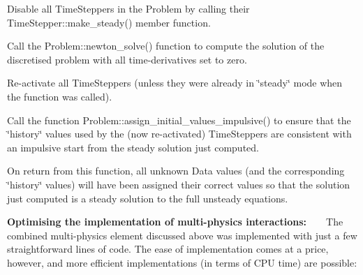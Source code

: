 \begin{DoxyItemize}
\begin{DoxyEnumerate}
\item Disable all {\ttfamily Time\+Steppers} in the {\ttfamily Problem} by calling their {\ttfamily Time\+Stepper\+::make\+\_\+steady()} member function. ~\newline
~\newline

\item Call the {\ttfamily Problem\+::newton\+\_\+solve()} function to compute the solution of the discretised problem with all time-\/derivatives set to zero. ~\newline
~\newline

\item Re-\/activate all {\ttfamily Time\+Steppers} (unless they were already in \char`\"{}steady\char`\"{} mode when the function was called). ~\newline
~\newline

\item Call the function {\ttfamily Problem\+::assign\+\_\+initial\+\_\+values\+\_\+impulsive()} to ensure that the \char`\"{}history\char`\"{} values used by the (now re-\/activated) {\ttfamily Time\+Steppers} are consistent with an impulsive start from the steady solution just computed. ~\newline
~\newline

\end{DoxyEnumerate}On return from this function, all unknown {\ttfamily Data} values (and the corresponding \char`\"{}history\char`\"{} values) will have been assigned their correct values so that the solution just computed is a steady solution to the full unsteady equations. ~\newline
~\newline

\item {\bfseries \label{index_opt}%
%
Optimising the implementation of multi-\/physics interactions\+:} ~\newline
~\newline
 The combined multi-\/physics element discussed above was implemented with just a few straightforward lines of code. The ease of implementation comes at a price, however, and more efficient implementations (in terms of C\+PU time) are possible\+: ~\newline
~\newline


\end{DoxyItemize}
